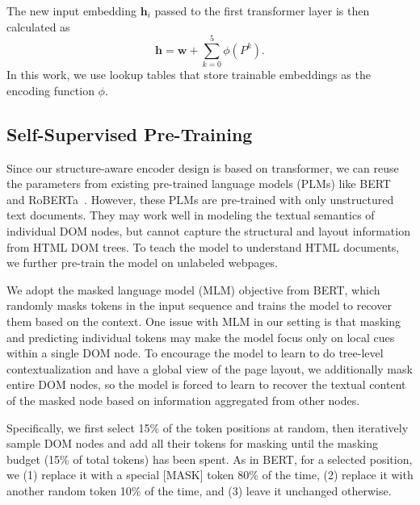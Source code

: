 \documentclass[sigconf, nonacm]{acmart}
\begin{document}
The new input embedding $\mathbf{h}_i$ passed to the first transformer layer is then calculated as
\begin{equation}
    \mathbf{h}=\mathbf{w}+\sum_{k=0}^{5}{\phi(P^k)}.
\end{equation}
In this work, we use lookup tables that store trainable embeddings as the encoding function $\phi$.


\subsection{Self-Supervised Pre-Training}

Since our structure-aware encoder design is based on transformer, we can reuse the parameters from existing pre-trained language models (PLMs) like BERT~\cite{devlin-etal-2019-bert} and RoBERTa~\cite{liu2019roberta}. However, these PLMs are pre-trained with only unstructured text documents. They may work well in modeling the textual semantics of individual DOM nodes, but cannot capture the structural and layout information from HTML DOM trees. To teach the model to understand HTML documents, we further pre-train the model on unlabeled webpages. 

We adopt the masked language model (MLM) objective from BERT, which randomly masks tokens in the input sequence and trains the model to recover them based on the context. One issue with MLM in our setting is that masking and predicting individual tokens may make the model focus only on local cues within a single DOM node. To encourage the model to learn to do tree-level contextualization and have a global view of the page layout, we additionally mask entire DOM nodes, so the model is forced to learn to recover the textual content of the masked node based on information aggregated from other nodes.

Specifically, we first select 15\% of the token positions at random, then iteratively sample DOM nodes and add all their tokens for masking until the masking budget (15\% of total tokens) has been spent. As in BERT, for a selected position, we (1) replace it with a special [MASK] token 80\% of the time, (2) replace it with another random token 10\% of the time, and (3) leave it unchanged otherwise.
\end{document}
